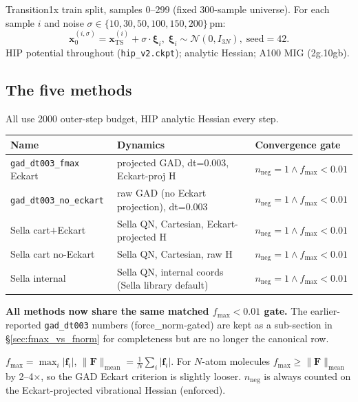 \documentclass[11pt]{article}
\begin{document}
Transition1x train split, samples 0--299 (fixed 300-sample universe).
For each sample $i$ and noise $\sigma \in \{10,30,50,100,150,200\}$\,pm:
\[
\mathbf{x}_0^{(i,\sigma)} = \mathbf{x}_{\text{TS}}^{(i)} + \sigma \cdot \boldsymbol{\xi}_i,\;
\boldsymbol{\xi}_i \sim \mathcal{N}(0, I_{3N}),\;\text{seed}=42.
\]
HIP potential throughout (\texttt{hip\_v2.ckpt}); analytic Hessian; A100 MIG (2g.10gb).

\subsection{The five methods}

All use 2000 outer-step budget, HIP analytic Hessian every step.

\begin{center}
\begin{tabular}{lll}
\toprule
Name & Dynamics & Convergence gate \\
\midrule
\texttt{gad\_dt003\_fmax} Eckart        & projected GAD, dt=0.003, Eckart-proj H            & $n_{\text{neg}}{=}1 \wedge f_{\max}{<}0.01$ \\
\texttt{gad\_dt003\_no\_eckart}         & raw GAD (no Eckart projection), dt=0.003          & $n_{\text{neg}}{=}1 \wedge f_{\max}{<}0.01$ \\
Sella cart$+$Eckart                     & Sella QN, Cartesian, Eckart-projected H           & $n_{\text{neg}}{=}1 \wedge f_{\max}{<}0.01$ \\
Sella cart no-Eckart                    & Sella QN, Cartesian, raw H                        & $n_{\text{neg}}{=}1 \wedge f_{\max}{<}0.01$ \\
Sella internal                          & Sella QN, internal coords (Sella library default) & $n_{\text{neg}}{=}1 \wedge f_{\max}{<}0.01$ \\
\bottomrule
\end{tabular}
\end{center}

\textbf{All methods now share the same matched $f_{\max}{<}0.01$ gate.} The earlier-reported
\texttt{gad\_dt003} numbers (force\_norm-gated) are kept as a sub-section in §\ref{sec:fmax_vs_fnorm}
for completeness but are no longer the canonical row.

$f_{\max} = \max_i |\mathbf{f}_i|$, $\|\mathbf{F}\|_{\text{mean}} = \frac{1}{N}\sum_i |\mathbf{f}_i|$.
For $N$-atom molecules $f_{\max} \geq \|\mathbf{F}\|_{\text{mean}}$ by
2--4$\times$, so the GAD Eckart criterion is slightly looser. $n_{\text{neg}}$
is always counted on the Eckart-projected vibrational Hessian (enforced).
\end{document}
